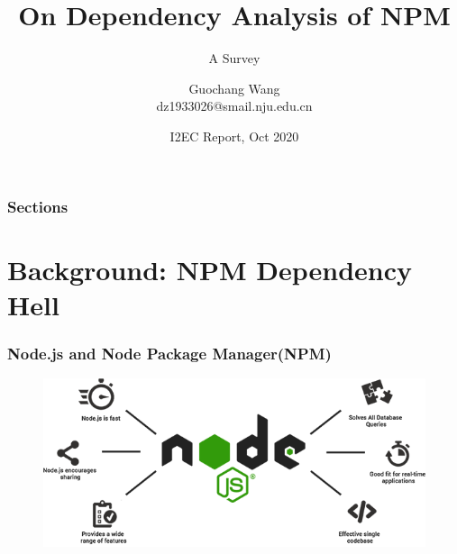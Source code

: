 \documentclass{beamer}
\title[] %
{On Dependency Analysis of NPM}
\subtitle{A Survey}
\author[Wang] %
{Guochang Wang\\dz1933026@smail.nju.edu.cn}
\institute[ICS] %
{
  Institute of Computer Software\\
  Nanjing University
}
\date[Report 2020.10] %
{I2EC Report, Oct 2020}
\begin{document}
\frame{\titlepage}


\begin{frame}
\frametitle{Sections}
\tableofcontents
\end{frame}


\section{Background: NPM Dependency Hell}

\begin{frame}
\frametitle{Node.js and Node Package Manager(NPM)}
\begin{figure}
    \centering
    \includegraphics[height=0.4\textheight]{nodejs.png}
\end{figure}
\end{frame}
\end{document}
